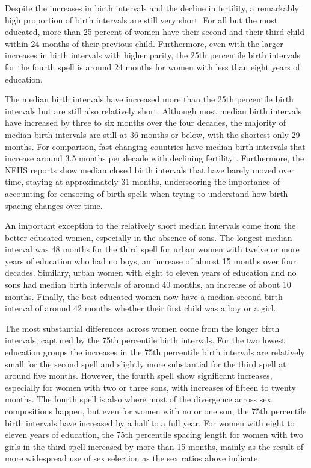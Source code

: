 \documentclass[12pt,letterpaper]{article}
\begin{document}
Despite the increases in birth intervals and the decline in fertility, a remarkably high 
proportion of birth intervals are still very short.
For all but the most educated, more than 25 percent of women have their second and their
third child within 24 months of their previous child.
Furthermore, even with the larger increases in birth intervals with higher parity, the 
25th percentile birth intervals for the fourth spell is around 24 months for women with 
less than eight years of education. 

The median birth intervals have increased more than the 25th percentile birth intervals
but are still also relatively short.
Although most median birth intervals have increased by three to six months over the four 
decades, the majority of median birth intervals are still at 36 months or below, 
with the shortest only 29 months.
For comparison, fast changing countries have median birth intervals that increase around 
3.5 months per decade with declining fertility \citep{Rutstein2011,Casterline2016}.
Furthermore, the NFHS reports show median closed birth intervals that have barely
moved over time, staying at approximately 31 months, underscoring the importance of 
accounting for censoring of birth spells when trying to understand how birth spacing 
changes over time.

An important exception to the relatively short median intervals come from the better 
educated women, especially in the absence of sons.
The longest median interval was 48 months for the third spell for urban women with twelve 
or more years of education who had no boys, an increase of almost 15 months over
four decades.
Similary, urban women with eight to eleven years of education and no sons had median
birth intervals of around 40 months, an increase of about 10 months.
Finally, the best educated women now have a median second birth interval of around 42
months whether their first child was a boy or a girl.


The most substantial differences across women come from the longer birth intervals, 
captured by the 75th percentile birth intervals.
For the two lowest education groups the increases in the 75th percentile birth 
intervals are relatively small for the second spell and slightly more substantial for the 
third spell at around five months.
However, the fourth spell show significant increases, especially for women with two
or three sons, with increases of fifteen to twenty months.
The fourth spell is also where most of the divergence across sex compositions happen,
but even for women with no or one son, the 75th percentile birth intervals have
increased by a half to a full year.
For women with eight to eleven years of education, the 75th percentile spacing length for 
women with two girls in the third spell increased by more than 15 months, mainly as the 
result of more widespread use of sex selection as the sex ratios above indicate.
\end{document}
